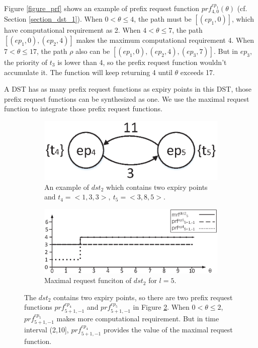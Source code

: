 \documentclass[sigconf]{acmart}
\begin{document}
Figure \ref{figure_prf} shows an example of prefix request function $prf^{ep_1}_{4,0}(\theta)$ (cf. Section \ref{section_dst_1}). When $0<\theta\leq4$, the path must be $[(ep_1,0)]$, which have computational requirement as 2. When $4<\theta\leq7$, the path $[(ep_1,0),(ep_2,4)]$ makes the maximum computational requirement 4. When $7<\theta\leq17$, the path $\rho$ also can be $[(ep_1,0),(ep_2,4),(ep_3,7)]$. But in $ep_3$, the priority of $t_3$ is lower than 4, so the prefix request function wouldn't accumulate it. The function will keep returning 4 until $\theta$ exceeds 17.

A DST has as many prefix request functions as expiry points in this DST, those prefix request functions can be synthesized as one. We use the maximal request function to integrate those prefix request functions.
\begin{figure}
  \centering
  \begin{subfigure}[t]{3.25in}
    \centering
    \includegraphics[scale=.45]{graphics/figure_dst2.eps}
    \caption{An example of $dst_2$ which contains two expiry points and $t_4=<1,3,3>,\ t_5=<3,8,5>$.}\label{figure_dst2}
  \end{subfigure}
  \quad
  \begin{subfigure}[t]{3.25in}
    \centering
    \includegraphics[scale=.325]{graphics/figure_mrf.eps}
    \caption{Maximal request funciton of $dst_2$ for $l=5$.}\label{figure_mrf}
  \end{subfigure}
  \caption{The $dst_2$ contains two expiry points, so there are two prefix request functions $prf^{ep_4}_{5+1,-1}$ and $prf^{ep_5}_{5+1,-1}$ in Figure \ref{figure_mrf}. When $0<\theta\leq2$, $prf^{ep_5}_{5+1,-1}$ makes more computational requirement. But in time interval (2,10], $prf^{ep_4}_{5+1,-1}$ provides the value of the maximal request function.}\label{figure_dst2_mrf}
\end{figure}
\end{document}
